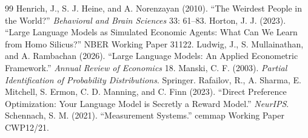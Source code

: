 \documentclass[10pt,letterpaper]{article}
\begin{document}
\begin{thebibliography}{99}
 Henrich, J., S. J. Heine, and A. Norenzayan (2010). ``The Weirdest People in the World?'' \textit{Behavioral and Brain Sciences} 33: 61--83.
 Horton, J. J. (2023). ``Large Language Models as Simulated Economic Agents: What Can We Learn from Homo Silicus?'' NBER Working Paper 31122.
 Ludwig, J., S. Mullainathan, and A. Rambachan (2026). ``Large Language Models: An Applied Econometric Framework.'' \textit{Annual Review of Economics} 18.
 Manski, C. F. (2003). \textit{Partial Identification of Probability Distributions}. Springer.
 Rafailov, R., A. Sharma, E. Mitchell, S. Ermon, C. D. Manning, and C. Finn (2023). ``Direct Preference Optimization: Your Language Model is Secretly a Reward Model.'' \textit{NeurIPS}.
 Schennach, S. M. (2021). ``Measurement Systems.'' cemmap Working Paper CWP12/21.
\end{thebibliography}
\end{document}
